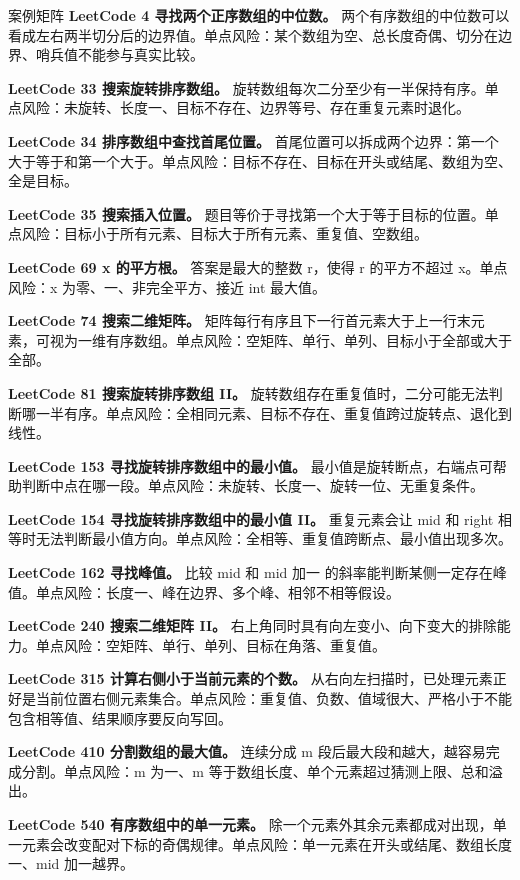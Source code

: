 \begin{principlebox}{案例矩阵}
\textbf{LeetCode 4 寻找两个正序数组的中位数。}
两个有序数组的中位数可以看成左右两半切分后的边界值。单点风险：某个数组为空、总长度奇偶、切分在边界、哨兵值不能参与真实比较。

\textbf{LeetCode 33 搜索旋转排序数组。}
旋转数组每次二分至少有一半保持有序。单点风险：未旋转、长度一、目标不存在、边界等号、存在重复元素时退化。

\textbf{LeetCode 34 排序数组中查找首尾位置。}
首尾位置可以拆成两个边界：第一个大于等于和第一个大于。单点风险：目标不存在、目标在开头或结尾、数组为空、全是目标。

\textbf{LeetCode 35 搜索插入位置。}
题目等价于寻找第一个大于等于目标的位置。单点风险：目标小于所有元素、目标大于所有元素、重复值、空数组。

\textbf{LeetCode 69 x 的平方根。}
答案是最大的整数 r，使得 r 的平方不超过 x。单点风险：x 为零、一、非完全平方、接近 int 最大值。

\textbf{LeetCode 74 搜索二维矩阵。}
矩阵每行有序且下一行首元素大于上一行末元素，可视为一维有序数组。单点风险：空矩阵、单行、单列、目标小于全部或大于全部。

\textbf{LeetCode 81 搜索旋转排序数组 II。}
旋转数组存在重复值时，二分可能无法判断哪一半有序。单点风险：全相同元素、目标不存在、重复值跨过旋转点、退化到线性。

\textbf{LeetCode 153 寻找旋转排序数组中的最小值。}
最小值是旋转断点，右端点可帮助判断中点在哪一段。单点风险：未旋转、长度一、旋转一位、无重复条件。

\textbf{LeetCode 154 寻找旋转排序数组中的最小值 II。}
重复元素会让 mid 和 right 相等时无法判断最小值方向。单点风险：全相等、重复值跨断点、最小值出现多次。

\textbf{LeetCode 162 寻找峰值。}
比较 mid 和 mid 加一 的斜率能判断某侧一定存在峰值。单点风险：长度一、峰在边界、多个峰、相邻不相等假设。

\textbf{LeetCode 240 搜索二维矩阵 II。}
右上角同时具有向左变小、向下变大的排除能力。单点风险：空矩阵、单行、单列、目标在角落、重复值。

\textbf{LeetCode 315 计算右侧小于当前元素的个数。}
从右向左扫描时，已处理元素正好是当前位置右侧元素集合。单点风险：重复值、负数、值域很大、严格小于不能包含相等值、结果顺序要反向写回。

\textbf{LeetCode 410 分割数组的最大值。}
连续分成 m 段后最大段和越大，越容易完成分割。单点风险：m 为一、m 等于数组长度、单个元素超过猜测上限、总和溢出。

\textbf{LeetCode 540 有序数组中的单一元素。}
除一个元素外其余元素都成对出现，单一元素会改变配对下标的奇偶规律。单点风险：单一元素在开头或结尾、数组长度一、mid 加一越界。


\end{principlebox}
